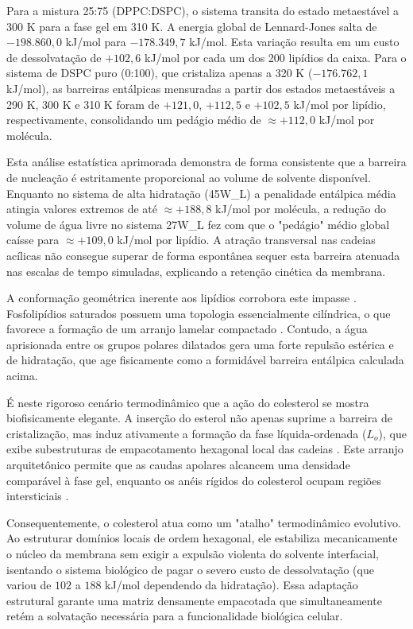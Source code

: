 \documentclass[12pt]{article} %
\begin{document}
Para a mistura 25:75 (DPPC:DSPC), o sistema transita do estado metaestável a 300 K para a fase gel em 310 K. A energia global de Lennard-Jones salta de $-198.860,0$ kJ/mol para $-178.349,7$ kJ/mol. Esta variação resulta em um custo de dessolvatação de $+102,6$ kJ/mol por cada um dos 200 lipídios da caixa. Para o sistema de DSPC puro (0:100), que cristaliza apenas a 320 K ($-176.762,1$ kJ/mol), as barreiras entálpicas mensuradas a partir dos estados metaestáveis a 290 K, 300 K e 310 K foram de $+121,0$, $+112,5$ e $+102,5$ kJ/mol por lipídio, respectivamente, consolidando um pedágio médio de $\approx +112,0$ kJ/mol por molécula.

Esta análise estatística aprimorada demonstra de forma consistente que a barreira de nucleação é estritamente proporcional ao volume de solvente disponível. Enquanto no sistema de alta hidratação (45W\_L) a penalidade entálpica média atingia valores extremos de até $\approx +188,8$ kJ/mol por molécula, a redução do volume de água livre no sistema 27W\_L fez com que o "pedágio" médio global caísse para $\approx +109,0$ kJ/mol por lipídio. A atração transversal nas cadeias acílicas não consegue superar de forma espontânea sequer esta barreira atenuada nas escalas de tempo simuladas, explicando a retenção cinética da membrana.

A conformação geométrica inerente aos lipídios corrobora este impasse \cite{lee2022}. Fosfolipídios saturados possuem uma topologia essencialmente cilíndrica, o que favorece a formação de um arranjo lamelar compactado \cite{lee2022}. Contudo, a água aprisionada entre os grupos polares dilatados gera uma forte repulsão estérica e de hidratação, que age fisicamente como a formidável barreira entálpica calculada acima.

É neste rigoroso cenário termodinâmico que a ação do colesterol se mostra biofisicamente elegante. A inserção do esterol não apenas suprime a barreira de cristalização, mas induz ativamente a formação da fase líquida-ordenada ($L_o$), que exibe subestruturas de empacotamento hexagonal local das cadeias \cite{sodt2014}. Este arranjo arquitetônico permite que as caudas apolares alcancem uma densidade comparável à fase gel, enquanto os anéis rígidos do colesterol ocupam regiões intersticiais \cite{liu2012, sodt2014}. 

Consequentemente, o colesterol atua como um "atalho" termodinâmico evolutivo. Ao estruturar domínios locais de ordem hexagonal, ele estabiliza mecanicamente o núcleo da membrana sem exigir a expulsão violenta do solvente interfacial, isentando o sistema biológico de pagar o severo custo de dessolvatação (que variou de $102$ a $188$ kJ/mol dependendo da hidratação). Essa adaptação estrutural garante uma matriz densamente empacotada que simultaneamente retém a solvatação necessária para a funcionalidade biológica celular.
\end{document}
